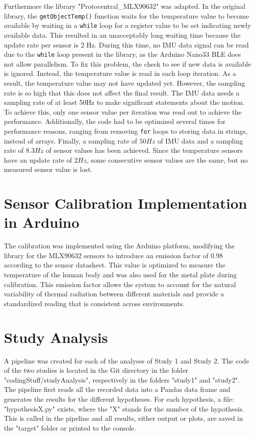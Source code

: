 Furthermore the library "Protocentral\_MLX90632" was adapted. In the original library, the \texttt{getObjectTemp()} function waits for the temperature value to become available by waiting in a \texttt{while} loop for a register value to be set indicating newly available data. This resulted in an unacceptably long waiting time because the update rate per sensor is 2 Hz. 
During this time, no IMU data signal can be read due to the \texttt{while} loop present in the library, as the Arduino Nano33 BLE does not allow parallelism. 
To fix this problem, the check to see if new data is available is ignored. 
Instead, the temperature value is read in each loop iteration. 
As a result, the temperature value may not have updated yet. 
However, the sampling rate is so high that this does not affect the final result.
The IMU data needs a sampling rate of at least 50Hz to make significant statements about the motion. 
To achieve this, only one sensor value per iteration was read out to achieve the performance. 
Additionally, the code had to be optimized several times for performance reasons, ranging from removing \texttt{for} loops to storing data in strings, instead of arrays. 
Finally, a sampling rate of $50Hz$ of IMU data and a sampling rate of $8.3Hz$ of sensor values has been achieved.
Since the temperature sensors have an update rate of $2Hz$, some consecutive sensor values are the same, but no measured sensor value is lost.

\section{Sensor Calibration Implementation in Arduino}
The calibration was implemented using the Arduino platform, modifying the library for the MLX90632 sensors to introduce an emission factor of $0.98$ according to the sensor datasheet. 
This value is optimized to measure the temperature of the human body and was also used for the metal plate during calibration. 
This emission factor allows the system to account for the natural variability of thermal radiation between different materials and provide a standardized reading that is consistent across environments.

\section{Study Analysis}
A pipeline was created for each of the analyses of Study 1 and Study 2. 
The code of the two studies is located in the Git directory in the folder "codingStuff/studyAnalysis", respectively in the folders "study1" and "study2".
The pipeline first reads all the recorded data into a Pandas data frame and generates the results for the different hypotheses.
For each hypothesis, a file: "hypothesisX.py" exists, where the "X" stands for the number of the hypothesis. 
This is called in the pipeline and all results, either output or plots, are saved in the "target" folder or printed to the console.

